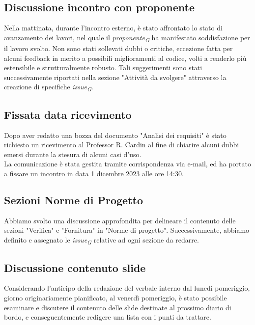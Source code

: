\documentclass{article}
\begin{document}
    \subsection{Discussione incontro con proponente}
        Nella mattinata, durante l'incontro esterno, è stato affrontato lo stato di avanzamento dei lavori, nel quale il \textit{proponente}\textsubscript{\textit{G}} ha manifestato soddisfazione per il lavoro svolto. Non sono stati sollevati dubbi o critiche, eccezione fatta per alcuni feedback in merito a possibili miglioramenti al codice, volti a renderlo più estensibile e strutturalmente robusto. Tali suggerimenti sono stati successivamente riportati nella sezione "Attività da svolgere" attraverso la creazione di specifiche \textit{issue}\textsubscript{\textit{G}}.

    \subsection{Fissata data ricevimento}
        Dopo aver redatto una bozza del documento "Analisi dei requisiti" è stato richiesto un ricevimento al Professor R. Cardin al fine di chiarire alcuni dubbi emersi durante la stesura di alcuni casi d'uso.\\
        La comunicazione è stata gestita tramite corrispondenza via e-mail, ed ha portato a fissare un incontro in data 1 dicembre 2023 alle ore 14:30.

    \subsection{Sezioni Norme di Progetto}
        Abbiamo svolto una discussione approfondita per delineare il contenuto delle sezioni "Verifica" e "Fornitura" in "Norme di progetto". Successivamente, abbiamo definito e assegnato le \textit{issue}\textsubscript{\textit{G}} relative ad ogni sezione da redarre. 
    
    \subsection{Discussione contenuto slide}
        Considerando l'anticipo della redazione del verbale interno dal lunedì pomeriggio, giorno originariamente pianificato, al venerdì pomeriggio, è stato possibile esaminare e discutere il contenuto delle slide destinate al prossimo diario di bordo, e conseguentemente redigere una lista con i punti da trattare.  
        
\end{document}
